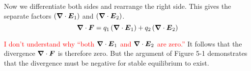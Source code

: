 Now we differentiate both sides and rearrange the right side.
This gives the separate factors $(\boldsymbol{\nabla} \cdot \boldsymbol{E}_1)$ and $(\boldsymbol{\nabla} \cdot \boldsymbol{E}_2)$.
\begin{equation*}
  \boldsymbol{\nabla} \cdot \boldsymbol{F} =
  q_1 \left( \boldsymbol{\nabla} \cdot \boldsymbol{E}_1 \right) +
  q_2 \left( \boldsymbol{\nabla} \cdot \boldsymbol{E}_2 \right) \nonumber
\end{equation*}

\textcolor{red}{I don't understand why ``both $\boldsymbol{\nabla} \cdot \boldsymbol{E}_1$ and 
$\boldsymbol{\nabla} \cdot \boldsymbol{E}_2$ are zero.''}
It follows that the divergence $\boldsymbol{\nabla} \cdot \boldsymbol{F}$ is therefore zero.
But the argument of Figure 5-1 demonstrates that the divergence must be negative
for stable equilibrium to exist.
